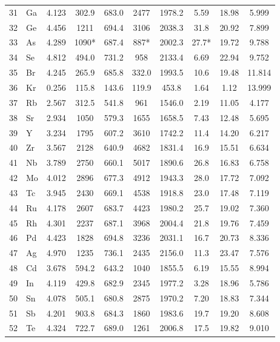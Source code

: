 \documentclass[12pt,a4paper]{article}
\theoremstyle{remark}
\begin{document}
\begin{longtable}{@{}llcccccccc@{}}
		31 & Ga  & 4.123 & 302.9  & 683.0  & 2477   & 1978.2 & 5.59  & 18.98 & 5.999 \\
		32 & Ge  & 4.456 & 1211   & 694.4  & 3106   & 2038.3 & 31.8  & 20.92 & 7.899 \\
		33 & As  & 4.289 & 1090*  & 687.4  & 887*   & 2002.3 & 27.7* & 19.72 & 9.788 \\
		34 & Se  & 4.812 & 494.0  & 731.2  & 958    & 2133.4 & 6.69  & 22.94 & 9.752 \\
		35 & Br  & 4.245 & 265.9  & 685.8  & 332.0  & 1993.5 & 10.6  & 19.48 & 11.814 \\
		36 & Kr  & 0.256 & 115.8  & 143.6  & 119.9  & 453.8  & 1.64  & 1.12  & 13.999 \\
		37 & Rb  & 2.567 & 312.5  & 541.8  & 961    & 1546.0 & 2.19  & 11.05 & 4.177 \\
		38 & Sr  & 2.934 & 1050   & 579.3  & 1655   & 1658.5 & 7.43  & 12.48 & 5.695 \\
		39 & Y   & 3.234 & 1795   & 607.2  & 3610   & 1742.2 & 11.4  & 14.20 & 6.217 \\
		40 & Zr  & 3.567 & 2128   & 640.9  & 4682   & 1831.4 & 16.9  & 15.51 & 6.634 \\
		41 & Nb  & 3.789 & 2750   & 660.1  & 5017   & 1890.6 & 26.8  & 16.83 & 6.758 \\
		42 & Mo  & 4.012 & 2896   & 677.3  & 4912   & 1943.3 & 28.0  & 17.72 & 7.092 \\
		43 & Tc  & 3.945 & 2430   & 669.1  & 4538   & 1918.8 & 23.0  & 17.48 & 7.119 \\
		44 & Ru  & 4.178 & 2607   & 683.7  & 4423   & 1980.2 & 25.7  & 19.02 & 7.360 \\
		45 & Rh  & 4.301 & 2237   & 687.1  & 3968   & 2004.4 & 21.8  & 19.76 & 7.459 \\
		46 & Pd  & 4.423 & 1828   & 694.8  & 3236   & 2031.1 & 16.7  & 20.73 & 8.336 \\
		47 & Ag  & 4.970 & 1235   & 736.1  & 2435   & 2156.0 & 11.3  & 23.47 & 7.576 \\
		48 & Cd  & 3.678 & 594.2  & 643.2  & 1040   & 1855.5 & 6.19  & 15.55 & 8.994 \\
		49 & In  & 4.119 & 429.8  & 682.9  & 2345   & 1977.2 & 3.28  & 18.96 & 5.786 \\
		50 & Sn  & 4.078 & 505.1  & 680.8  & 2875   & 1970.2 & 7.20  & 18.83 & 7.344 \\
		51 & Sb  & 4.201 & 903.8  & 684.3  & 1860   & 1983.6 & 19.7  & 19.20 & 8.608 \\
		52 & Te  & 4.324 & 722.7  & 689.0  & 1261   & 2006.8 & 17.5  & 19.82 & 9.010 \\

\end{longtable}
\end{document}
